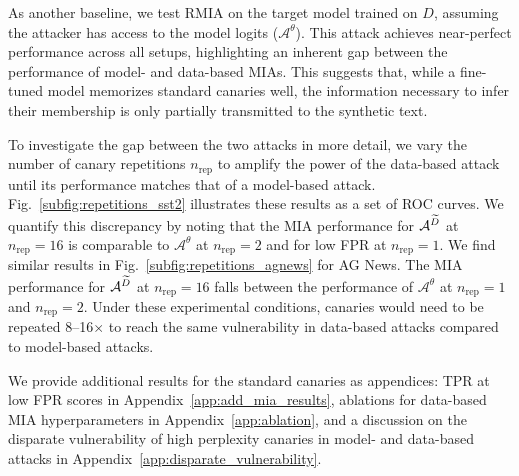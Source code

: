 As another baseline, we test RMIA on the target model trained on $D$, assuming the attacker has access to the model logits ($\mathcal{A}^\theta$).
This attack achieves near-perfect performance across all setups, highlighting an inherent gap between the performance of model- and data-based MIAs.
This suggests that, while a fine-tuned model memorizes standard canaries well, the information necessary to infer their membership is only partially transmitted to the synthetic text.

To investigate the gap between the two attacks in more detail, we vary the number of canary repetitions $n_\textrm{rep}$ to amplify the power of the data-based attack until its performance matches that of a model-based attack.
Fig.~\ref{subfig:repetitions_sst2} illustrates these results as a set of ROC curves.
%
We quantify this discrepancy by noting that the MIA performance for $\mathcal{A}^{{\widetilde{D}}}$ at $n_\textrm{rep}=16$ is comparable to $\mathcal{A}^\theta$ at $n_\textrm{rep}=2$ and for low FPR at $n_\textrm{rep}=1$.
We find similar results in Fig.~\ref{subfig:repetitions_agnews} for AG News.
The MIA performance for $\mathcal{A}^{{\widetilde{D}}}$ at $n_\textrm{rep}=16$ falls between the performance of $\mathcal{A}^{\theta}$ at $n_\textrm{rep}=1$ and $n_\textrm{rep}=2$. Under these experimental conditions, canaries would need to be repeated \numrange{8}{16}$\times$ to reach the same vulnerability in data-based attacks compared to model-based attacks.

We provide additional results for the standard canaries as appendices: TPR at low FPR scores in Appendix~\ref{app:add_mia_results}, ablations for data-based MIA hyperparameters in Appendix~\ref{app:ablation}, and a discussion on the disparate vulnerability of high perplexity canaries in model- and data-based attacks in Appendix~\ref{app:disparate_vulnerability}.

